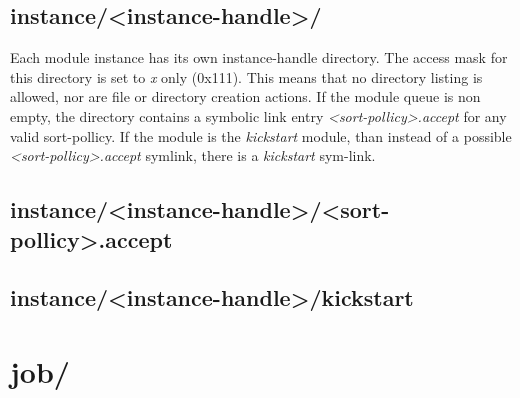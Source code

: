 \subsection{instance/<instance-handle>/}
Each module instance has its own instance-handle directory. The  access mask for this directory is set to \emph{x} only (0x111).  This means that no directory listing is allowed, nor are file or directory creation actions. If the module queue is non empty, the directory contains a symbolic link entry \emph{<sort-pollicy>.accept} for any valid sort-pollicy. If the module is the \emph{kickstart} module, than instead of a possible \emph{<sort-pollicy>.accept} symlink, there is a \emph{kickstart} sym-link.
\subsection{instance/<instance-handle>/<sort-pollicy>.accept}
\subsection{instance/<instance-handle>/kickstart}
\section{job/}
